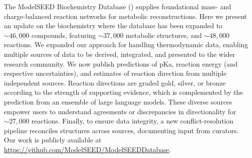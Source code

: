 The ModelSEED Biochemistry Database (\modelseedurl) supplies foundational mass- and charge-balanced reaction networks for metabolic reconstructions.
Here we present an update on the biochemistry where the database has been expanded to $\sim46,000$ compounds, featuring $\sim37,000$ metabolic structures, and $\sim48,000$ reactions.
We expanded our approach for handling thermodynamic data, enabling multiple sources of data to be derived, integrated, and presented to the wider research community.
We now publish predictions of pKa, reaction energy (and respective uncertainties), and estimates of reaction direction from multiple independent sources.
Reaction directions are graded gold, silver, or bronze according to the strength of supporting evidence, which is complemented by the prediction from an ensemble of large language models.
These diverse sources empower users to understand agreements or discrepancies in directionality for $\sim27,000$ reactions.
Finally, to ensure data integrity, a new conflict-resolution pipeline reconciles structures across sources, documenting input from curators.
Our work is publicly available at \url{https://github.com/ModelSEED/ModelSEEDDatabase}.

